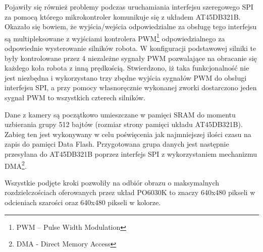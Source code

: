 Pojawiły się również problemy podczas uruchamiania interfejsu szeregowego SPI za pomocą którego mikrokontroler komunikuje się z układem AT45DB321B. Okazało się bowiem, że wyjścia/wejścia odpowiedzialne za obsługę tego interfejsu są multipleksowane z wyjściami kontrolera PWM\footnote{PWM -- Pulse Width Modulation} odpowiedzialnego za odpowiednie wysterowanie silników robota. W konfiguracji podstawowej silniki te były kontrolowane przez 4 niezależne sygnały PWM pozwalające na obracanie się każdego koła robota z inną prędkością. Stwierdzono, iż taka funkcjonalność nie jest niezbędna i wykorzystano trzy zbędne wyjścia sygnałów PWM do obsługi interfejsu SPI, a przy pomocy własnoręcznie wykonanej zworki dostarczono jeden sygnał PWM to wszystkich czterech silników.

Dane z kamery są początkowo umieszczane w pamięci SRAM do momentu uzbierania grupy 512 bajtów (rozmiar strony pamięci układu AT45DB321B). Zabieg ten jest wykonywany w celu poświęcenia jak najmniejszej ilości czasu na zapis do pamięci Data Flash. Przygotowana grupa danych jest następnie przesyłana do AT45DB321B poprzez interfejs SPI z wykorzystaniem mechanizmu DMA\footnote{DMA - Direct Memory Access}.

Wszystkie podjęte kroki pozwoliły na odbiór obrazu o maksymalnych rozdzielczościach oferowanych przez układ PO6030K to znaczy 640x480 pikseli w odcieniach szarości oraz 640x480 pikseli w kolorze.